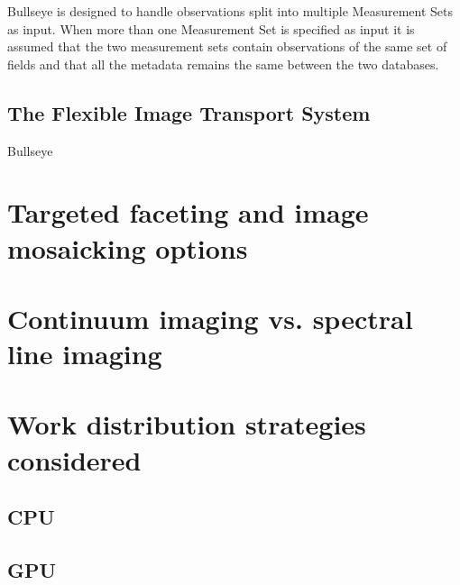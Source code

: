 Bullseye is designed to handle observations split into multiple Measurement Sets as input. When more than one Measurement Set is specified as input it is assumed that
the two measurement sets contain observations of the same set of fields and that all the metadata remains the same between the two databases.
\subsection{The Flexible Image Transport System}
Bullseye 
\section{Targeted faceting and image mosaicking options}
\section{Continuum imaging vs. spectral line imaging}
\section{Work distribution strategies considered}
\subsection{CPU}
\subsection{GPU}